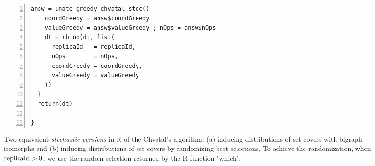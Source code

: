 \begin{figure*}[t!]
\begin{minipage}{0.51\textwidth}
\begin{Verbatim}[frame=lines, fontsize=\footnotesize,numbers=left,
numbersep=3pt,firstline=1,xleftmargin=9mm]
    answ = unate_greedy_chvatal_stoc() 
    coordGreedy = answ$coordGreedy
    valueGreedy = answ$valueGreedy ; nOps = answ$nOps
    dt = rbind(dt, list(
      replicaId   = replicaId,
      nOps        = nOps,
      coordGreedy = coordGreedy,
      valueGreedy = valueGreedy
    ))
  }
  return(dt)
  
}
\end{Verbatim}


\end{minipage}
\vspace*{2ex}
\caption{
Two equivalent {\it stochastic versions} in R of the Chvatal's algorithm:   
(a) inducing distributions of set covers with bigraph isomorphs and
(b) inducing distributions of set covers by randomizing best selections. To achieve the randomization, when ${\rm replicaId} > 0$, we use the random selection returned by the R-function "which".
}
\label{fg_bgmc_unate_greedy_chvatal_stoc}
\end{figure*}


